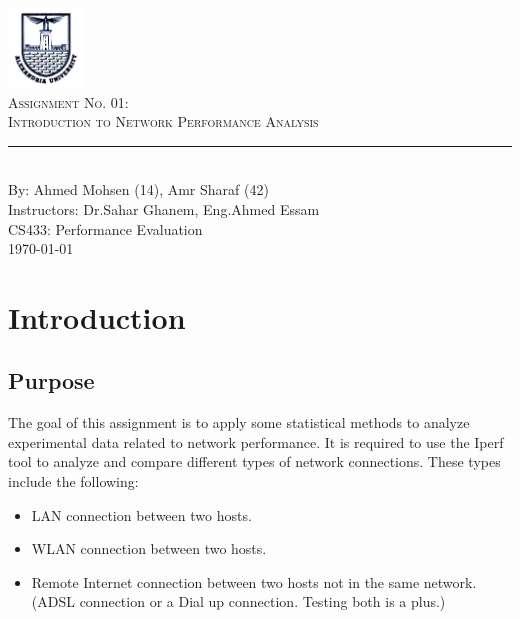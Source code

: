 \documentclass[aps,letterpaper,10pt]{revtex4}
\newcommand{\labno}{01}
\newcommand{\labtitle}{Introduction to Network Performance Analysis}
\newcommand{\authorname}{Ahmed Mohsen (14), Amr Sharaf (42)}
\newcommand{\professor}{Dr.Sahar Ghanem, Eng.Ahmed Essam}
\newcommand{\classno}{CS433: Performance Evaluation}
\begin{document}


\begin{titlepage}
\begin{center}
\includegraphics[width=2cm]{Logo_Alexandria_University.jpg}\\
{\LARGE \textsc{Assignment No. \labno:} \\ \vspace{4pt}}
{\Large \textsc{\labtitle} \\ \vspace{4pt}} 
\rule[13pt]{\textwidth}{1pt} \\ \vspace{150pt}
{\large By: \authorname \\ \vspace{10pt}
Instructors: \professor \\ \vspace{10pt}
\classno \\ \vspace{10pt}
\today}
\end{center}
\end{titlepage}


\section{Introduction}
\subsection{Purpose}
The goal of this assignment is to apply some statistical methods to analyze experimental data related to network performance. It is required to use the Iperf tool to analyze and compare different types of network connections. These types include the following: \begin{itemize}
\item LAN connection between two hosts.
\item WLAN connection between two hosts.
\item Remote Internet connection between two hosts not in the same network. (ADSL
connection or a Dial up connection. Testing both is a plus.)
\end{itemize}
\vspace{3mm} %
\end{document}
